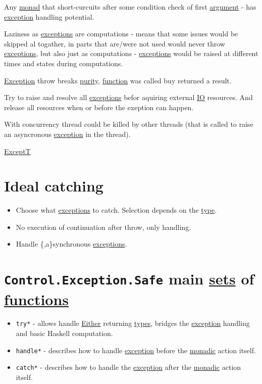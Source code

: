 \documentclass[a4paper,14pt,oneside]{book}
\begin{document}
Any \hyperref[orgfcdbd32]{monad} that short-curcuits after some condition check of first \hyperref[orgd532b33]{argument} - has \hyperref[org7dff0cd]{exception} handling potential.

Laziness as \hyperref[orgb96d5c8]{exceptions} are computations - means that some issues would be skipped al togather, in parts that are/were not used would never throw \hyperref[orgb96d5c8]{exceptions}, but also just as computations - \hyperref[orgb96d5c8]{exceptions} would be raised at different times and states during computations.

\hyperref[org7dff0cd]{Exception} throw breaks \hyperref[org426c124]{purity}, \hyperref[org7f95458]{function} was called buy returned a result.

Try to raise and resolve all \hyperref[orgb96d5c8]{exceptions} befor aquiring external \hyperref[orgc1b02c4]{IO} resources. And release all resources when or before the exeption can happen.

With concurrency thread could be killed by other threads (that is called to raise an asyncronous \hyperref[org7dff0cd]{exception} in the thread).

\hyperref[org75f56a4]{ExceptT}

\section{Ideal catching}
\label{sec:orge4e790b}

\begin{itemize}
\item Choose what \hyperref[orgb96d5c8]{exceptions} to catch. Selection depends on the \hyperref[orgad34ec6]{type}.
\item No execution of continuation after throw, only handling.
\item Handle \{,a\}synchronous \hyperref[orgb96d5c8]{exceptions}.
\end{itemize}

\section{\texttt{Control.Exception.Safe} main \hyperref[orgf622e87]{sets} of \hyperref[org1d14dfb]{functions}}
\label{sec:orgb418b61}

\begin{itemize}
\item \texttt{try*} - allows handle \hyperref[org0cb7a6b]{Either} returning \hyperref[org8e179ef]{types}, bridges the \hyperref[org7dff0cd]{exception} handling and basic Haskell computation.
\item \texttt{handle*} - describes how to handle \hyperref[org7dff0cd]{exception} before the \hyperref[org3606b99]{monadic} action itself.
\item \texttt{catch*} - describes how to handle the \hyperref[org7dff0cd]{exception} after the \hyperref[org3606b99]{monadic} action itself.
\end{itemize}
\end{document}

